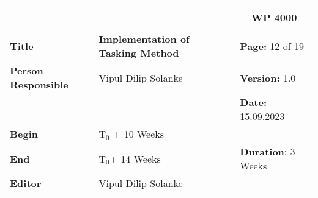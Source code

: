 \begin{table}[!h]
  \begin{center}
    \begin{tabular}{|p{35mm}||p{55mm}|p{50mm}||p{40mm}|}
      \hline
      \multicolumn{3}{|l||}{\textbf{}} & \multicolumn{1}{c|}{}                                                                                                                                                \\
      \multicolumn{3}{|l||}{\textbf{}} & \multicolumn{1}{c|}{\textbf{WP 4000}}                                                                                                                                \\
      \multicolumn{3}{|l||}{\textbf{}} & \multicolumn{1}{c|}{}                                                                                                                                                \\
      \hline\hline
      \textbf{Title}                   & \multicolumn{2}{p{7cm}||}{\textbf{Implementation of Tasking Method}}
                                       & \textbf{Page:} 12 of 19                                                                                                                                             \\
      \hline
      \textbf{Person Responsible}        & \multicolumn{2}{l||}{Vipul Dilip Solanke}                                                                                                   & \textbf{Version:} 1.0   \\
      \hline
      \multicolumn{3}{|l||}{}          & \textbf{Date:} 15.09.2023                                                                                                                                          \\
      \hline\hline
      \textbf{Begin}                  & \multicolumn{2}{l||}{T$_0$ + 10 Weeks}                                                                                                                &                         \\
      \hline
      \textbf{End}                    & \multicolumn{2}{l||}{T$_0$+ 14 Weeks}                                                                                                        & \textbf{Duration}: 3 Weeks \\
      \hline\hline
      \textbf{Editor}              & \multicolumn{3}{l|}{Vipul Dilip Solanke}                                                                                                                              \\

\end{tabular}
\end{center}
\end{table}
